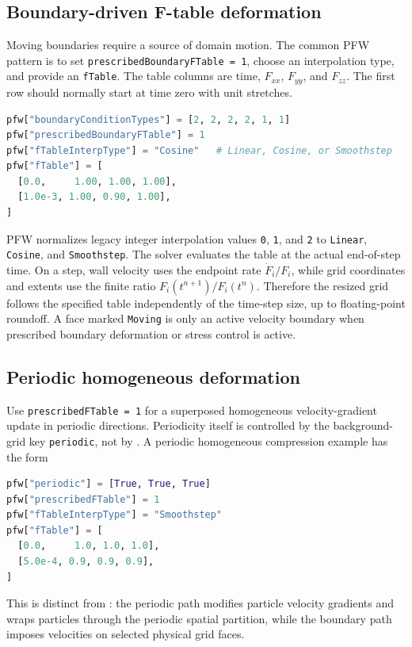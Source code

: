 \subsection{Boundary-driven F-table deformation}

Moving boundaries require a source of domain motion.  The common PFW pattern is to set \texttt{prescribedBoundaryFTable = 1}, choose an interpolation type, and provide an \texttt{fTable}.  The table columns are time, $F_{xx}$, $F_{yy}$, and $F_{zz}$.  The first row should normally start at time zero with unit stretches.
\begin{lstlisting}[language=Python,caption={Boundary-driven diagonal deformation history.}]
pfw["boundaryConditionTypes"] = [2, 2, 2, 2, 1, 1]
pfw["prescribedBoundaryFTable"] = 1
pfw["fTableInterpType"] = "Cosine"   # Linear, Cosine, or Smoothstep
pfw["fTable"] = [
  [0.0,     1.00, 1.00, 1.00],
  [1.0e-3, 1.00, 0.90, 1.00],
]
\end{lstlisting}
PFW normalizes legacy integer interpolation values \texttt{0}, \texttt{1}, and \texttt{2} to \texttt{Linear}, \texttt{Cosine}, and \texttt{Smoothstep}.  The solver evaluates the table at the actual end-of-step time.  On a  step, wall velocity uses the endpoint rate $\dot F_i/F_i$, while grid coordinates and extents use the finite ratio $F_i(t^{n+1})/F_i(t^n)$.  Therefore the resized grid follows the specified table independently of the time-step size, up to floating-point roundoff.  A face marked \texttt{Moving} is only an active velocity boundary when prescribed boundary deformation or stress control is active.

\subsection{Periodic homogeneous deformation}

Use \texttt{prescribedFTable = 1} for a superposed homogeneous velocity-gradient update in periodic directions.  Periodicity itself is controlled by the background-grid key \texttt{periodic}, not by .  A periodic homogeneous compression example has the form
\begin{lstlisting}[language=Python,caption={Periodic F-table control.}]
pfw["periodic"] = [True, True, True]
pfw["prescribedFTable"] = 1
pfw["fTableInterpType"] = "Smoothstep"
pfw["fTable"] = [
  [0.0,     1.0, 1.0, 1.0],
  [5.0e-4, 0.9, 0.9, 0.9],
]
\end{lstlisting}
This is distinct from : the periodic path modifies particle velocity gradients and wraps particles through the periodic spatial partition, while the boundary path imposes velocities on selected physical grid faces.

